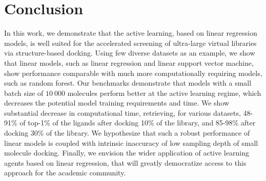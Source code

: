 \section{Conclusion}

In this work, we demonstrate that the active learning, based on linear regression models, is well suited for the accelerated screening of ultra-large virtual libraries via structure-based docking. Using few diverse datasets as an example, we show that linear models, such as linear regression and linear support vector machine, show performance comparable with much more computationally requiring models, such as random forest. Our benchmarks demonstrate that models with a small batch size of $10\ 000$ molecules perform better at the active learning regime, which decreases the potential model training requirements and time. We show substantial decrease in computational time, retrieving, for various datasets, 48-91\% of top-1\% of the ligands after docking 10\% of the library, and 85-98\% after docking 30\% of the library. We hypothesize that such a robust performance of linear models is coupled with intrinsic inaccuracy of low sampling depth of small molecule docking. Finally, we envision the wider application of active learning agents based on linear regression, that will greatly democratize access to this approach for the academic community. 
